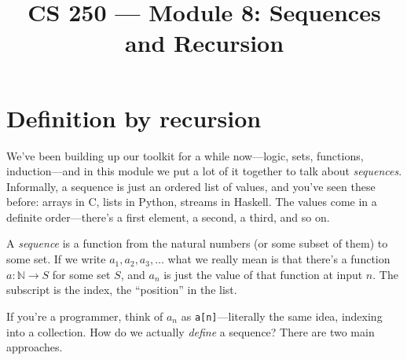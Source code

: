 \documentclass[11pt]{article}
\title{CS 250 --- Module 8: Sequences and Recursion}
\author{}
\date{}
\begin{document}
\maketitle

\begin{readingmap}



\end{readingmap}

\section{Definition by recursion}
We've been building up our toolkit for a while now---logic, sets, functions, induction---and in this module we put a lot of it together to talk about \emph{sequences}. Informally, a sequence is just an ordered list of values, and you've seen these before: arrays in C, lists in Python, streams in Haskell. The values come in a definite order---there's a first element, a second, a third, and so on.

\begin{definition}[Sequence]
A \emph{sequence} is a function from the natural numbers (or some subset of them) to some set. If we write $a_1, a_2, a_3, \ldots$ what we really mean is that there's a function $a : \mathbb{N} \to S$ for some set $S$, and $a_n$ is just the value of that function at input $n$. The subscript is the index, the ``position'' in the list.
\end{definition}

\noindent If you're a programmer, think of $a_n$ as \texttt{a[n]}---literally the same idea, indexing into a collection. How do we actually \emph{define} a sequence? There are two main approaches.
\end{document}
